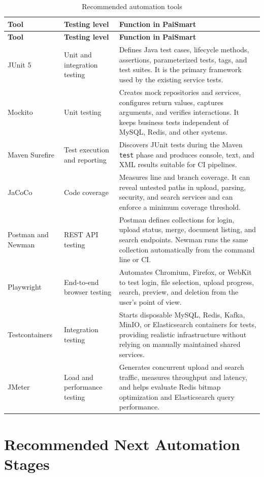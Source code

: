 \documentclass[11pt,a4paper]{article}
\begin{document}
\begin{longtable}{@{}p{}p{}p{}@{}}
\caption{Recommended automation tools}\\
\toprule
\textbf{Tool} & \textbf{Testing level} & \textbf{Function in PaiSmart} \\
\midrule
\endfirsthead
\toprule
\textbf{Tool} & \textbf{Testing level} & \textbf{Function in PaiSmart} \\
\midrule
\endhead
JUnit 5 &
Unit and integration testing &
Defines Java test cases, lifecycle methods, assertions, parameterized tests, tags, and
test suites. It is the primary framework used by the existing service tests. \\
Mockito &
Unit testing &
Creates mock repositories and services, configures return values, captures arguments,
and verifies interactions. It keeps business tests independent of MySQL, Redis, and
other systems. \\
Maven Surefire &
Test execution and reporting &
Discovers JUnit tests during the Maven \texttt{test} phase and produces console, text,
and XML results suitable for CI pipelines. \\
JaCoCo &
Code coverage &
Measures line and branch coverage. It can reveal untested paths in upload, parsing,
security, and search services and can enforce a minimum coverage threshold. \\
Postman and Newman &
REST API testing &
Postman defines collections for login, upload status, merge, document listing, and
search endpoints. Newman runs the same collection automatically from the command line
or CI. \\
Playwright &
End-to-end browser testing &
Automates Chromium, Firefox, or WebKit to test login, file selection, upload progress,
search, preview, and deletion from the user's point of view. \\
Testcontainers &
Integration testing &
Starts disposable MySQL, Redis, Kafka, MinIO, or Elasticsearch containers for tests,
providing realistic infrastructure without relying on manually maintained shared
services. \\
JMeter &
Load and performance testing &
Generates concurrent upload and search traffic, measures throughput and latency, and
helps evaluate Redis bitmap optimization and Elasticsearch query performance. \\
\bottomrule
\end{longtable}

\section{Recommended Next Automation Stages}
\end{document}

